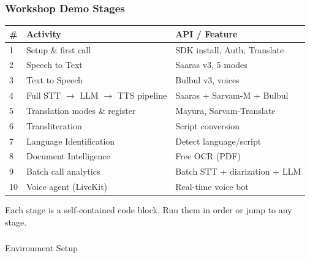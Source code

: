 \begin{frame}[fragile]\frametitle{Workshop Demo Stages}
\begin{center}
\begin{tabular}{|p{0.5cm}|p{2.8cm}|p{2.8cm}|}
\hline
\textbf{\#} & \textbf{Activity} & \textbf{API / Feature} \\
\hline
1 & Setup \& first call & SDK install, Auth, Translate \\
2 & Speech to Text & Saaras v3, 5 modes \\
3 & Text to Speech & Bulbul v3, voices \\
4 & Full STT $\to$ LLM $\to$ TTS pipeline & Saaras + Sarvam-M + Bulbul \\
5 & Translation modes \& register & Mayura, Sarvam-Translate \\
6 & Transliteration & Script conversion \\
7 & Language Identification & Detect language/script \\
8 & Document Intelligence & Free OCR (PDF) \\
9 & Batch call analytics & Batch STT + diarization + LLM \\
10 & Voice agent (LiveKit) & Real-time voice bot \\
\hline
\end{tabular}
\end{center}
{\small Each stage is a self-contained code block. Run them in order or jump to any stage.}
\end{frame}


\begin{frame}[fragile]\frametitle{}
\begin{center}
{\Large Environment Setup}
\end{center}
\end{frame}

